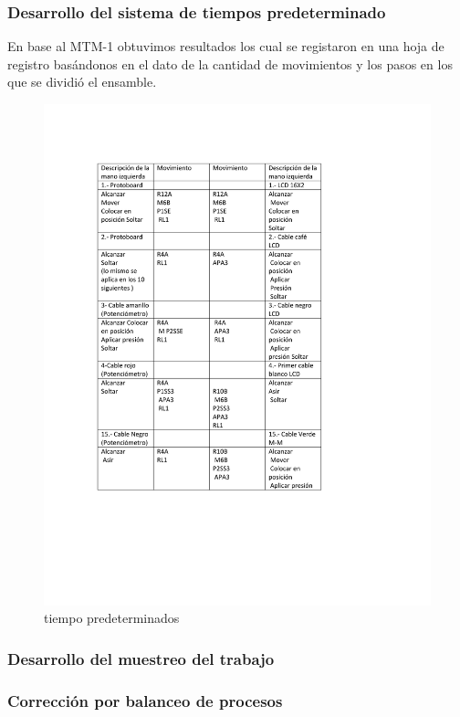     \subsubsection{Desarrollo del sistema de tiempos predeterminado}
    En base al MTM-1 obtuvimos resultados los cual se registaron en una hoja de registro basándonos en el dato de la cantidad de movimientos y los pasos en los que se dividió el ensamble.
    \begin{figure}[H]
        \centering
        \includegraphics[scale=0.40]{29/img/tiemposPredeterminado.pdf}
        \caption{tiempo predeterminados  }
        \label{fig:tiemposPredeterminado.pdf}
    \end{figure}
    \subsubsection{Desarrollo del muestreo del trabajo}
    \subsubsection{Corrección por balanceo de procesos}
